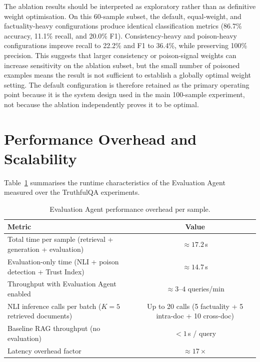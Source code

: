 \normalsize
The ablation results should be interpreted as exploratory rather than as definitive
weight optimisation. On this 60-sample subset, the default, equal-weight, and
factuality-heavy configurations produce identical classification metrics (86.7\% accuracy,
11.1\% recall, and 20.0\% F1). Consistency-heavy and poison-heavy configurations improve
recall to 22.2\% and F1 to 36.4\%, while preserving 100\% precision. This suggests that
larger consistency or poison-signal weights can increase sensitivity on the ablation subset,
but the small number of poisoned examples means the result is not sufficient to establish a
globally optimal weight setting. The default configuration is therefore retained as the
primary operating point because it is the system design used in the main 100-sample
experiment, not because the ablation independently proves it to be optimal.

\section{Performance Overhead and Scalability}
\label{sec:ch6_overhead}

Table~\ref{tab:latency} summarises the runtime characteristics of the Evaluation Agent
measured over the TruthfulQA experiments.

\begin{table}[h]
\centering
\caption{Evaluation Agent performance overhead per sample.}
\label{tab:latency}
\begin{tabular}{lc}
\hline
\textbf{Metric} & \textbf{Value} \\
\hline
Total time per sample (retrieval + generation + evaluation) & $\approx 17.2$\,s \\
Evaluation-only time (NLI + poison detection + Trust Index)  & $\approx 14.7$\,s \\
Throughput with Evaluation Agent enabled                    & $\approx 3$--$4$ queries/min \\
NLI inference calls per batch ($K=5$ retrieved documents)   & Up to 20 calls (5 factuality + 5 intra-doc + 10 cross-doc) \\
Baseline RAG throughput (no evaluation)                     & $<1$\,s / query \\
Latency overhead factor                                     & $\approx 17\times$ \\
\hline
\end{tabular}
\end{table}

